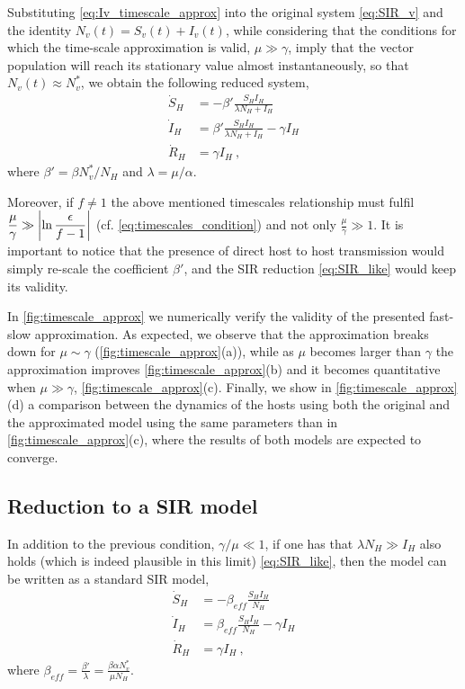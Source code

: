 Substituting \cref{eq:Iv_timescale_approx} into the original system
\cref{eq:SIR_v} and the identity $N_v(t)=S_v(t)+I_v(t)$, while considering that
the conditions for which the time-scale approximation is valid, $\mu\gg\gamma$,
imply that the vector population will reach its stationary value almost
instantaneously, so that $N_v(t)\approx N_v^*$, we obtain the following reduced
system,
\begin{equation}\label{eq:SIR_like}
    \begin{aligned}
        \dot{S}_H & =-\beta'\frac{S_H I_H}{\lambda N_H + I_H}            \\
        \dot{I}_H & =\beta'\frac{S_H I_H}{\lambda N_H + I_H}- \gamma I_H \\
        \dot{R}_H & =\gamma I_H \ ,
    \end{aligned}
\end{equation}
where $\beta'=\beta N_v^*/N_H$ and $\lambda=\mu/\alpha$.

Moreover, if $f\neq1$ the above mentioned timescales relationship
must fulfil
$\displaystyle\frac{\mu}{\gamma}\gg\abs{\ln{\frac{\epsilon}{f-1}}}$ (cf.
\cref{eq:timescales_condition}) and not only
$\displaystyle\frac{\mu}{\gamma}\gg 1$. It is important to notice that the
presence of direct host to host transmission would simply re-scale the
coefficient $\beta'$, and the SIR reduction \cref{eq:SIR_like} would keep its
validity.

In \cref{fig:timescale_approx} we numerically verify the validity of the
presented fast-slow approximation. As expected, we observe that the
approximation breaks down for $\mu\sim\gamma$ (\cref{fig:timescale_approx}(a)),
while as
$\mu$ becomes larger than $\gamma$ the approximation improves
\cref{fig:timescale_approx}(b) and it becomes quantitative when $\mu\gg\gamma$,
\cref{fig:timescale_approx}(c). Finally, we show in
\cref{fig:timescale_approx}(d) a comparison between the dynamics of the hosts
using both the original and the approximated model using the same parameters
than in \cref{fig:timescale_approx}(c), where the results of both models are
expected to converge.

\subsection{Reduction to a SIR model}

In addition to the previous condition, $\gamma/\mu\ll1$, if one has that
$\lambda N_H \gg I_H$ also holds (which is indeed plausible in this limit)
\cref{eq:SIR_like}, then the model can be written as a standard SIR model,
\begin{equation}\label{eq:SIR}
    \begin{aligned}
        \dot{S}_H & =-\beta_{eff}\frac{S_HI_H}{N_H}            \\
        \dot{I}_H & =\beta_{eff}\frac{S_HI_H}{N_H}- \gamma I_H \\
        \dot{R}_H & =\gamma I_H \ ,
    \end{aligned}
\end{equation}
where $\displaystyle\beta_{eff}=\frac{\beta'}{\lambda}=\frac{\beta\alpha
        N_v^*}{\mu N_H}$.

